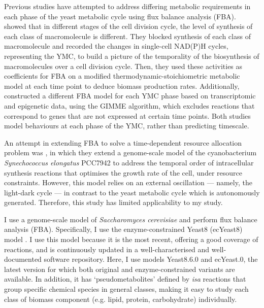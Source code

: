 Previous studies have attempted to address differing metabolic requirements in each phase of the yeast metabolic cycle using flux balance analysis (FBA).
\textcite{takhaveevTemporalSegregationBiosynthetic2023} showed that in different stages of the cell division cycle, the level of synthesis of each class of macromolecule is different.
They blocked synthesis of each class of macromolecule and recorded the changes in single-cell NAD(P)H cycles, representing the YMC, to build a picture of the temporality of the biosynthesis of macromolecules over a cell division cycle.
Then, they used these activities as coefficients for FBA on a modified thermodynamic-stoichiometric metabolic model at each time point to deduce biomass production rates.
Additionally, \textcite{cesurGenomeWideAnalysisYeast} constructed a different FBA model for each YMC phase based on transcriptomic and epigenetic data, using the GIMME algorithm, which excludes reactions that correspond to genes that are not expressed at certain time points.
Both studies model behaviours at each phase of the YMC, rather than predicting timescale.

An attempt in extending FBA to solve a time-dependent resource allocation problem was \textcite{reimersCellularTradeoffsOptimal2017}, in which they extend a genome-scale model of the cyanobacterium \textit{Synechococcus elongatus} PCC7942 to address the temporal order of intracellular synthesis reactions that optimises the growth rate of the cell, under resource constraints.
However, this model relies on an external oscillation --- namely, the light-dark cycle --- in contrast to the yeast metabolic cycle which is autonomously generated.
Therefore, this study has limited applicability to my study.

I use a genome-scale model of \textit{Saccharomyces cerevisiae} and perform flux balance analysis (FBA).
Specifically, I use the enzyme-constrained Yeast8 (ecYeast8) model \parencite{luConsensusCerevisiaeMetabolic2019}.
I use this model because it is the most recent, offering a good coverage of reactions, and is continuously updated in a well-characterised and well-documented software repository.
Here, I use models Yeast8.6.0 and ec\-Yeast.0, the latest version for which both original and enzyme-constrained variants are available.
In addition, it has `pseudometabolites' defined by \textit{isa} reactions \parencite{heavnerYeastExpandedReconstruction2012} that group specific chemical species in general classes, making it easy to study each class of biomass component (e.g. lipid, protein, carbohydrate) individually.


